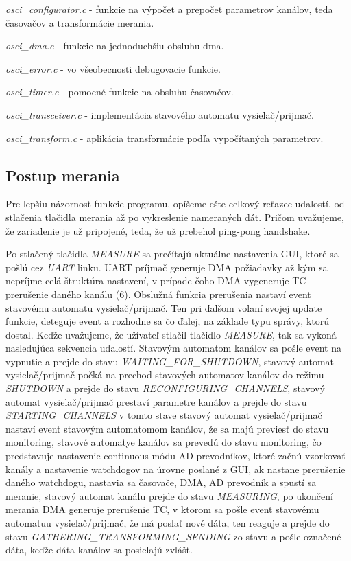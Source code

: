 \documentclass[main.tex]{subfiles}
\begin{document}
\begin{multicols*}{2}
			\textit{ osci\_configurator.c} -  funkcie na výpočet a prepočet parametrov kanálov, teda časovačov a transformácie merania. 
			
			\textit{ osci\_dma.c} - funkcie na jednoduchšiu obsluhu dma. 
			
			\textit{ osci\_error.c} - vo všeobecnosti debugovacie funkcie.
			
			\textit{ osci\_timer.c} - pomocné funkcie na obsluhu časovačov. 
			
			\textit{ osci\_transceiver.c} - implementácia stavového automatu vysielač/prijmač.
			
			\textit{ osci\_transform.c} - aplikácia transformácie podľa vypočítaných parametrov.
			
			\subsection{Postup merania}
			Pre lepšiu názornosť funkcie programu, opíšeme ešte celkový reťazec udalostí, od stlačenia tlačidla merania až po vykreslenie nameraných dát. Pričom uvažujeme, že zariadenie je už pripojené, teda, že už prebehol ping-pong handshake.
			
			Po stlačený tlačidla \textit{MEASURE} sa prečítajú aktuálne nastavenia GUI, ktoré sa pošlú cez \textit{UART} linku. UART príjmač generuje DMA požiadavky až kým sa nepríjme celá štruktúra nastavení, v prípade čoho DMA vygeneruje TC prerušenie daného kanálu (6).  Obslužná funkcia prerušenia nastaví event stavovému automatu vysielač/prijmač. Ten pri ďalšom volaní svojej update funkcie, deteguje event a rozhodne sa čo ďalej, na základe typu správy, ktorú dostal. Keďže uvažujeme, že užívateľ stlačil tlačidlo \textit{MEASURE}, tak sa vykoná nasledujúca sekvencia udalostí. Stavovým automatom kanálov sa pošle event na vypnutie a prejde do stavu \textit{WAITING\_FOR\_SHUTDOWN}, stavový automat vysielač/prijmač počká na prechod stavových automatov kanálov do režimu \textit{SHUTDOWN} a prejde do stavu \textit{RECONFIGURING\_CHANNELS}, stavový automat vysielač/prijmač prestaví parametre kanálov a prejde do stavu \textit{STARTING\_CHANNELS} v tomto stave stavový automat vysielač/prijmač nastaví event stavovým automatomom kanálov, že sa majú previesť do stavu monitoring, stavové automatye kanálov sa prevedú do stavu monitoring, čo predstavuje nastavenie continuous módu AD prevodníkov, ktoré začnú vzorkovať kanály a nastavenie watchdogov na úrovne poslané z GUI, ak nastane prerušenie daného watchdogu, nastavia sa časovače, DMA, AD prevodník a spustí sa meranie, stavový automat kanálu prejde do stavu \textit{MEASURING}, po ukončení merania DMA generuje prerušenie TC, v ktorom sa pošle event stavovému automatuu vysielač/prijmač, že má poslať nové dáta, ten reaguje a prejde do stavu \textit{GATHERING\_TRANSFORMING\_SENDING} zo stavu  a pošle označené dáta, keďže dáta kanálov sa posielajú zvlášť.
			

\end{multicols*}
\end{document}
